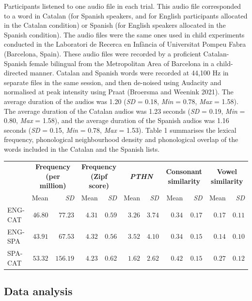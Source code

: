 \documentclass[
  man]{apa6}
\begin{document}
Participants listened to one audio file in each trial. This audio file
corresponded to a word in Catalan (for Spanish speakers, and for English
participants allocated in the Catalan condition) or Spanish (for English
speakers allocated in the Spanish condition). The audio files were the
same ones used in child experiments conducted in the Laboratori de
Recerca en Infància of Universitat Pompeu Fabra (Barcelona, Spain).
These audio files were recorded by a proficient Catalan-Spanish female
bilingual from the Metropolitan Area of Barcelona in a child-directed
manner. Catalan and Spanish words were recorded at 44,100 Hz in separate
files in the same session, and then de-noised using Audacity and
normalised at peak intensity using Praat (Broersma and Weenink 2021).
The average duration of the audios was 1.20 (\emph{SD} = 0.18,
\emph{Min} = 0.78, \emph{Max} = 1.58). The average duration of the
Catalan audios was 1.23 seconds (\emph{SD} = 0.19, \emph{Min} = 0.80,
\emph{Max} = 1.58), and the average duration of the Spanish audios was
1.16 seconds (\emph{SD} = 0.15, \emph{Min} = 0.78, \emph{Max} = 1.53).
Table 1 summarises the lexical frequency, phonological neighbourhood
density and phonological overlap of the words included in the Catalan
and the Spanish lists.

\captionsetup[table]{labelformat=empty,skip=1pt}
\begin{longtable}{lrrrrrrrrrr}
\toprule
 & \multicolumn{2}{c}{\textbf{Frequency (per million)}} & \multicolumn{2}{c}{\textbf{Frequency (Zipf score)}} & \multicolumn{2}{c}{\emph{\textbf{PTHN}}} & \multicolumn{2}{c}{\textbf{Consonant similarity}} & \multicolumn{2}{c}{\textbf{Vowel similarity}} \\ 
 \cmidrule(lr){2-3} \cmidrule(lr){4-5} \cmidrule(lr){6-7} \cmidrule(lr){8-9} \cmidrule(lr){10-11}
 & Mean & \emph{SD} & Mean & \emph{SD} & Mean & \emph{SD} & Mean & \emph{SD} & Mean & \emph{SD} \\ 
\midrule
ENG-CAT & $46.80$ & $77.23$ & $4.31$ & $0.59$ & $3.26$ & $3.74$ & $0.34$ & $0.17$ & $0.17$ & $0.11$ \\ 
ENG-SPA & $43.91$ & $67.53$ & $4.32$ & $0.56$ & $3.52$ & $4.10$ & $0.34$ & $0.15$ & $0.14$ & $0.10$ \\ 
SPA-CAT & $53.32$ & $156.19$ & $4.23$ & $0.62$ & $1.62$ & $2.62$ & $0.42$ & $0.15$ & $0.27$ & $0.12$ \\ 
 \bottomrule
\end{longtable}

\hypertarget{data-analysis}{%
\subsection{Data analysis}\label{data-analysis}}
\end{document}
